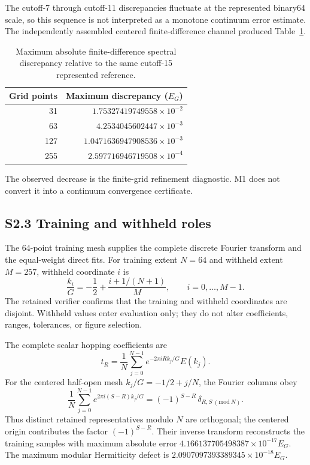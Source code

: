 The cutoff-7 through cutoff-11 discrepancies fluctuate at the represented
binary64 scale, so this sequence is not interpreted as a monotone continuum
error estimate. The independently assembled centered finite-difference channel
produced Table~\ref{tab:supp-m1-fd}.

\begin{table}[ht]
\centering
\caption{Maximum absolute finite-difference spectral discrepancy relative to
the same cutoff-15 represented reference.}
\label{tab:supp-m1-fd}
\begin{tabular}{@{}rr@{}}
\toprule
Grid points & Maximum discrepancy ($E_G$) \\
\midrule
31  & $1.75327419749558\times10^{-2}$ \\
63  & $4.2534045602447\times10^{-3}$ \\
127 & $1.0471636947908536\times10^{-3}$ \\
255 & $2.597716946719508\times10^{-4}$ \\
\bottomrule
\end{tabular}
\end{table}

The observed decrease is the finite-grid refinement diagnostic. M1 does not
convert it into a continuum convergence certificate.

\subsection*{S2.3 Training and withheld roles}

The 64-point training mesh supplies the complete discrete Fourier transform and
the equal-weight direct fits. For training extent $N=64$ and withheld extent
$M=257$, withheld coordinate $i$ is
\begin{equation}
 \frac{k_i}{G}=-\frac12+\frac{i+1/(N+1)}{M},
 \qquad i=0,\ldots,M-1.
 \label{eq:supp-m1-withheld}
\end{equation}
The retained verifier confirms that the training and withheld coordinates are
disjoint. Withheld values enter evaluation only; they do not alter coefficients,
ranges, tolerances, or figure selection.

The complete scalar hopping coefficients are
\begin{equation}
 t_R=\frac{1}{N}\sum_{j=0}^{N-1}
 e^{-2\pi iRk_j/G}E(k_j).
 \label{eq:supp-m1-transform}
\end{equation}
For the centered half-open mesh $k_j/G=-1/2+j/N$, the Fourier columns obey
\begin{equation}
 \frac{1}{N}\sum_{j=0}^{N-1}
 e^{2\pi i(S-R)k_j/G}
 =(-1)^{S-R}\,\delta_{R,S\ (\mathrm{mod}\ N)}.
 \label{eq:supp-m1-fourier-orthogonality}
\end{equation}
Thus distinct retained representatives modulo $N$ are orthogonal; the centered
origin contributes the factor $(-1)^{S-R}$. Their inverse transform reconstructs
the training samples with maximum absolute error
$4.166137705498387\times10^{-17}E_G$. The maximum modular Hermiticity defect is
$2.0907097393389345\times10^{-18}E_G$.

